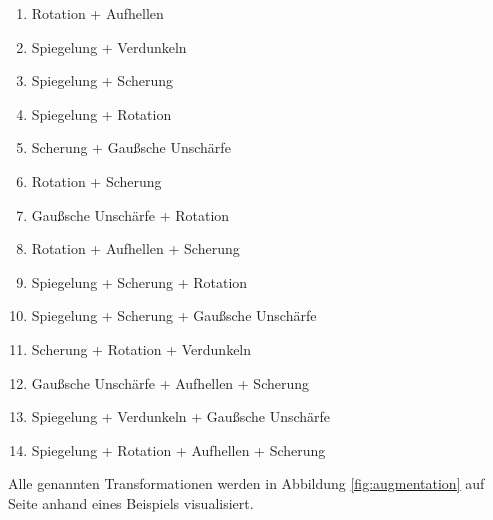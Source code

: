 \begin{enumerate}[noitemsep]
	\item{Rotation + Aufhellen}
	\item{Spiegelung + Verdunkeln}
	\item{Spiegelung + Scherung}
	\item{Spiegelung + Rotation}
	\item{Scherung + Gaußsche Unschärfe}
	\item{Rotation + Scherung}
	\item{Gaußsche Unschärfe + Rotation}
	\item{Rotation + Aufhellen + Scherung}
	\item{Spiegelung + Scherung + Rotation}
	\item{Spiegelung + Scherung + Gaußsche Unschärfe}
	\item{Scherung + Rotation + Verdunkeln}
	\item{Gaußsche Unschärfe + Aufhellen + Scherung}
	\item{Spiegelung + Verdunkeln + Gaußsche Unschärfe}
	\item{Spiegelung + Rotation + Aufhellen + Scherung}
\end{enumerate}

Alle genannten Transformationen werden in Abbildung \ref{fig:augmentation} auf Seite \pageref{fig:augmentation} anhand eines Beispiels visualisiert.

